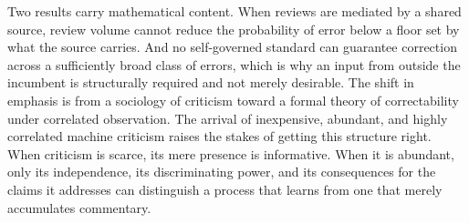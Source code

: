 \documentclass[11pt]{article}
\theoremstyle{remark}
\begin{document}
Two results carry mathematical content. When reviews are mediated by a shared source, review volume cannot reduce the probability of error below a floor set by what the source carries. And no self-governed standard can guarantee correction across a sufficiently broad class of errors, which is why an input from outside the incumbent is structurally required and not merely desirable. The shift in emphasis is from a sociology of criticism toward a formal theory of correctability under correlated observation. The arrival of inexpensive, abundant, and highly correlated machine criticism raises the stakes of getting this structure right. When criticism is scarce, its mere presence is informative. When it is abundant, only its independence, its discriminating power, and its consequences for the claims it addresses can distinguish a process that learns from one that merely accumulates commentary.
\end{document}
